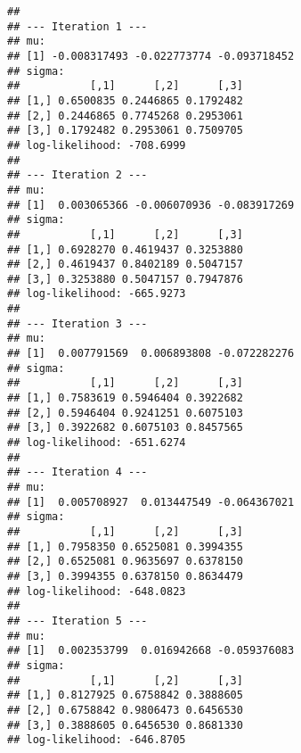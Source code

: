 \documentclass[
]{article}
\begin{document}
\begin{verbatim}
## 
## --- Iteration 1 ---
## mu:
## [1] -0.008317493 -0.022773774 -0.093718452
## sigma:
##           [,1]      [,2]      [,3]
## [1,] 0.6500835 0.2446865 0.1792482
## [2,] 0.2446865 0.7745268 0.2953061
## [3,] 0.1792482 0.2953061 0.7509705
## log-likelihood: -708.6999 
## 
## --- Iteration 2 ---
## mu:
## [1]  0.003065366 -0.006070936 -0.083917269
## sigma:
##           [,1]      [,2]      [,3]
## [1,] 0.6928270 0.4619437 0.3253880
## [2,] 0.4619437 0.8402189 0.5047157
## [3,] 0.3253880 0.5047157 0.7947876
## log-likelihood: -665.9273 
## 
## --- Iteration 3 ---
## mu:
## [1]  0.007791569  0.006893808 -0.072282276
## sigma:
##           [,1]      [,2]      [,3]
## [1,] 0.7583619 0.5946404 0.3922682
## [2,] 0.5946404 0.9241251 0.6075103
## [3,] 0.3922682 0.6075103 0.8457565
## log-likelihood: -651.6274 
## 
## --- Iteration 4 ---
## mu:
## [1]  0.005708927  0.013447549 -0.064367021
## sigma:
##           [,1]      [,2]      [,3]
## [1,] 0.7958350 0.6525081 0.3994355
## [2,] 0.6525081 0.9635697 0.6378150
## [3,] 0.3994355 0.6378150 0.8634479
## log-likelihood: -648.0823 
## 
## --- Iteration 5 ---
## mu:
## [1]  0.002353799  0.016942668 -0.059376083
## sigma:
##           [,1]      [,2]      [,3]
## [1,] 0.8127925 0.6758842 0.3888605
## [2,] 0.6758842 0.9806473 0.6456530
## [3,] 0.3888605 0.6456530 0.8681330
## log-likelihood: -646.8705
\end{verbatim}
\end{document}
